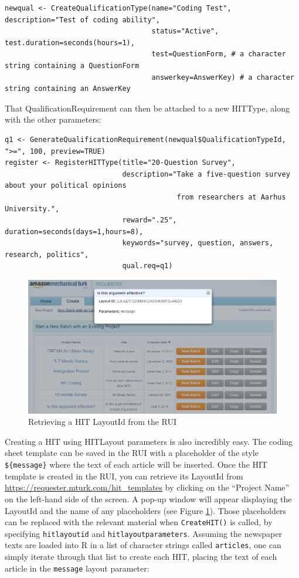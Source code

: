\documentclass[11pt]{article}
\begin{document}
\begin{Verbatim}[fontsize=\footnotesize, xleftmargin=3mm]
newqual <- CreateQualificationType(name="Coding Test", description="Test of coding ability",
                                   status="Active", test.duration=seconds(hours=1),
                                   test=QuestionForm, # a character string containing a QuestionForm
                                   answerkey=AnswerKey) # a character string containing an AnswerKey
\end{Verbatim}

\noindent That QualificationRequirement can then be attached to a new HITType, along with the other parameters:

\begin{Verbatim}[fontsize=\footnotesize, xleftmargin=3mm]
q1 <- GenerateQualificationRequirement(newqual$QualificationTypeId, ">=", 100, preview=TRUE)
register <- RegisterHITType(title="20-Question Survey",
                            description="Take a five-question survey about your political opinions 
                                         from researchers at Aarhus University.",
                            reward=".25", duration=seconds(days=1,hours=8),
                            keywords="survey, question, answers, research, politics",
                            qual.req=q1)
\end{Verbatim}

\begin{figure}
\begin{center}
\includegraphics[width=.6\textwidth]{LayoutId2}
\end{center}
\caption{Retrieving a HIT LayoutId from the RUI}\label{fig:layout}
\end{figure}

Creating a HIT using HITLayout parameters is also incredibly easy. The coding sheet template can be saved in the RUI with a placeholder of the style \verb|${message}| where the text of each article will be inserted. Once the HIT template is created in the RUI, you can retrieve its LayoutId from \url{https://requester.mturk.com/hit_templates} by clicking on the ``Project Name'' on the left-hand side of the screen. A pop-up window will appear displaying the LayoutId and the name of any placeholders (see Figure \ref{fig:layout}). Those placeholders can be replaced with the relevant material when \verb|CreateHIT()| is called, by specifying \verb|hitlayoutid| and \verb|hitlayoutparameters|. Assuming the newspaper texts are loaded into R in a list of character strings called \verb|articles|, one can simply iterate through that list to create each HIT, placing the text of each article in the \verb|message| layout parameter:
\end{document}
